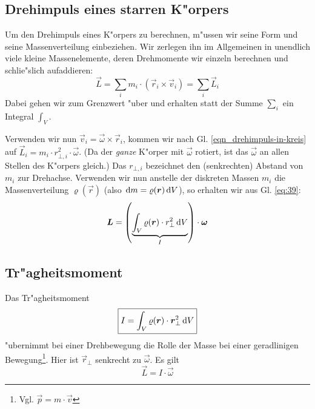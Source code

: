 \subsection{Drehimpuls eines starren K"orpers}
\label{kap_drehimpuls-starren-korpers}


Um den Drehimpuls eines K"orpers zu berechnen, m"ussen wir seine Form
und seine Massenverteilung einbeziehen. Wir zerlegen ihn im Allgemeinen
in unendlich viele kleine Massenelemente, deren Drehmomente wir
einzeln berechnen und schlie"slich aufaddieren:
\begin{equation}
   \label{eq:39}
   \vec L = \sum_i m_i \cdot (\vec r_i \times \vec v_i) = \sum_i \vec L_i
\end{equation}
Dabei gehen wir zum Grenzwert "uber und erhalten statt der Summe $\sum_i$
ein Integral $\int_V$.

Verwenden wir nun $\vec v_i = \vec \omega \times \vec r_i$, kommen wir
nach Gl. \eqref{eqn_drehimpuls-in-kreis} auf $\vec L_i = m_i \cdot
r_{\bot, i}^2 \cdot \vec \omega$. (Da der \emph{ganze} K"orper mit $\vec
\omega$ rotiert, ist das $\vec \omega$ an allen Stellen des K"orpers
gleich.)  Das $r_{\bot, i}$ bezeichnet den (senkrechten) Abstand von
$m_i$ zur Drehachse.  Verwenden wir nun anstelle der diskreten Massen
$m_i$ die Massenverteilung $\varrho(\vec r)$ (also $\, \mathrm{d} m = \varrho
(\boldsymbol{r}) \, \mathrm{d} V$), so erhalten wir aus Gl. \eqref{eq:39}:
\begin{equation}
   \label{eq:40}
   \boldsymbol{L} = \left ( \underbrace{\int_V \varrho(\boldsymbol{r}) \cdot  r_\bot^2 \, \mathrm{d} V}_I
     \right ) \cdot \boldsymbol{\omega}
\end{equation}

\subsection{Tr"agheitsmoment}
\label{kap_tragheitsmoment}



\begin{Def}
\label{def_traegheitsmoment}
Das Tr"agheitsmoment 
\begin{equation}
   \label{eqn_def_traegheitsmoment}
   \boxed{
I = \int_V \varrho(\boldsymbol{r}) \cdot \boldsymbol{r}_\bot^2 \, \mathrm{d} V
}
\end{equation}
"ubernimmt bei einer Drehbewegung die Rolle der Masse bei einer
geradlinigen Bewegung\footnote{Vgl. $\vec p = m \cdot \vec v$}. Hier
ist $\vec r_\bot$ senkrecht zu $\vec\omega$. Es gilt
\begin{equation}
   \label{eqn_drehimpuls-aus-traegheit}
   \vec L = I \cdot \vec \omega
\end{equation}
\end{Def}


